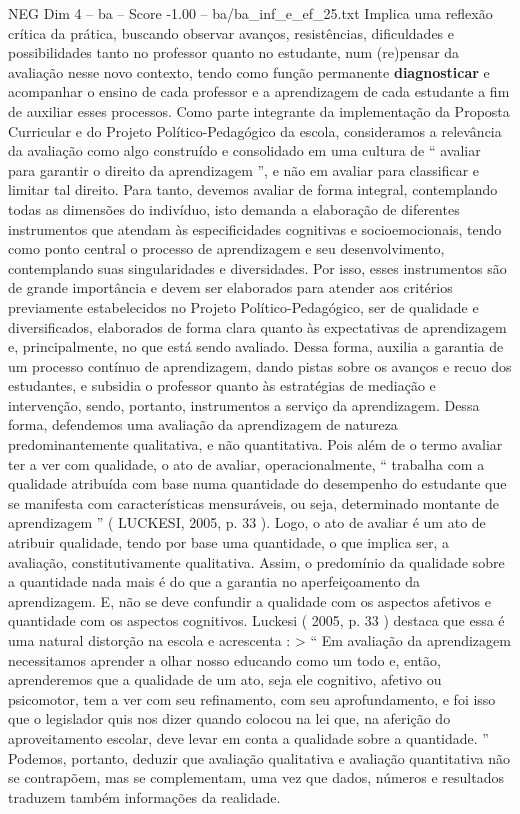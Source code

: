 \begin{textsample}{NEG Dim 4 – ba – Score -1.00 – ba/ba\_inf\_e\_ef\_25.txt}
Implica uma reflexão crítica da prática, buscando observar avanços, resistências, dificuldades e possibilidades tanto no professor quanto no estudante, num (re)pensar da avaliação nesse novo contexto, tendo como função permanente \textbf{diagnosticar} e acompanhar o ensino de cada professor e a aprendizagem de cada estudante a fim de auxiliar esses processos.
Como parte integrante da implementação da Proposta Curricular e do Projeto Político-Pedagógico da escola, consideramos a relevância da avaliação como algo construído e consolidado em uma cultura de “ avaliar para garantir o direito da aprendizagem ”, e não em avaliar para classificar e limitar tal direito.
Para tanto, devemos avaliar de forma integral, contemplando todas as dimensões do indivíduo, isto demanda a elaboração de diferentes instrumentos que atendam às especificidades cognitivas e socioemocionais, tendo como ponto central o processo de aprendizagem e seu desenvolvimento, contemplando suas singularidades e diversidades.
Por isso, esses instrumentos são de grande importância e devem ser elaborados para atender aos critérios previamente estabelecidos no Projeto Político-Pedagógico, ser de qualidade e diversificados, elaborados de forma clara quanto às expectativas de aprendizagem e, principalmente, no que está sendo avaliado.
Dessa forma, auxilia a garantia de um processo contínuo de aprendizagem, dando pistas sobre os avanços e recuo dos estudantes, e subsidia o professor quanto às estratégias de mediação e intervenção, sendo, portanto, instrumentos a serviço da aprendizagem.
Dessa forma, defendemos uma avaliação da aprendizagem de natureza predominantemente qualitativa, e não quantitativa.
Pois além de o termo avaliar ter a ver com qualidade, o ato de avaliar, operacionalmente, “ trabalha com a qualidade atribuída com base numa quantidade do desempenho do estudante que se manifesta com características mensuráveis, ou seja, determinado montante de aprendizagem ” ( LUCKESI, 2005, p. 33 ).
Logo, o ato de avaliar é um ato de atribuir qualidade, tendo por base uma quantidade, o que implica ser, a avaliação, constitutivamente qualitativa.
Assim, o predomínio da qualidade sobre a quantidade nada mais é do que a garantia no aperfeiçoamento da aprendizagem.
E, não se deve confundir a qualidade com os aspectos afetivos e quantidade com os aspectos cognitivos.
Luckesi ( 2005, p. 33 ) destaca que essa é uma natural distorção na escola e acrescenta : > “ Em avaliação da aprendizagem necessitamos aprender a olhar nosso educando como um todo e, então, aprenderemos que a qualidade de um ato, seja ele cognitivo, afetivo ou psicomotor, tem a ver com seu refinamento, com seu aprofundamento, e foi isso que o legislador quis nos dizer quando colocou na lei que, na aferição do aproveitamento escolar, deve levar em conta a qualidade sobre a quantidade. ” Podemos, portanto, deduzir que avaliação qualitativa e avaliação quantitativa não se contrapõem, mas se complementam, uma vez que dados, números e resultados traduzem também informações da realidade.

\end{textsample}
